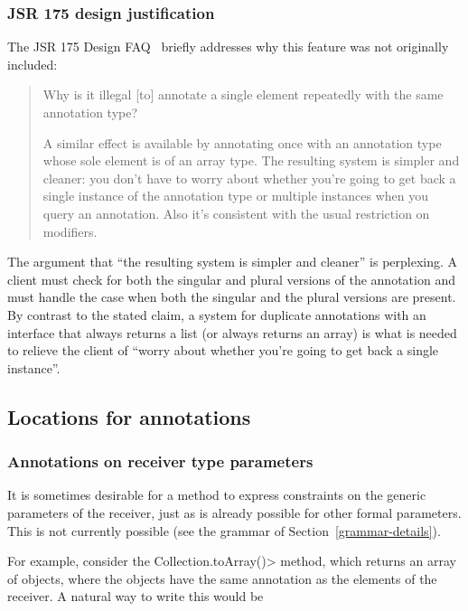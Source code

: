 \documentclass[10pt]{article}
\begin{document}
\subsubsection{JSR 175 design justification\label{duplicate-annotations-jsr175-justification}}

The JSR 175 Design FAQ~\cite{JSR175-PFD2} briefly addresses why this
feature was not originally included:

\begin{quote}
Why is it illegal [to] annotate a single element repeatedly with the same annotation type?

A similar effect is available by annotating once with an annotation type
whose sole element is of an array type. The resulting system is simpler and
cleaner: you don't have to worry about whether you're going to get back a
single instance of the annotation type or multiple instances when you query
an annotation. Also it's consistent with the usual restriction on
modifiers.
\end{quote}

The argument that ``the resulting system is simpler and cleaner'' is
perplexing.  A client must check for both the singular and plural versions
of the annotation and must handle the case when both the singular and the
plural versions are present.  By contrast to the stated claim, a system for
duplicate annotations with an interface that always returns a list (or
always returns an array) is what is needed to relieve the client of ``worry
about whether you're going to get back a single instance''.


\subsection{Locations for annotations\label{locations-for-annotations}}


\subsubsection{Annotations on receiver type parameters\label{receiver-type-parameter-annotations}}

It is sometimes desirable for a method to express constraints on the
generic parameters of the receiver, just as is already possible for other
formal parameters.  This is not currently possible (see the grammar of
Section~\ref{grammar-details}).

For example, consider the \<Collection.toArray()> method, which returns an
array of objects, where the objects have the same annotation as the
elements of the receiver.  A natural way to write this would be 
\end{document}
